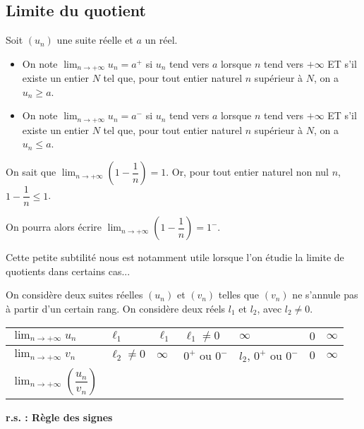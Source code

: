 \documentclass[11pt,fleqn]{book} %
\begin{document}
\subsection{Limite du quotient}


\begin{definition}Soit $(u_n)$ une suite réelle et $a$ un réel. 

\begin{itemize}
\item On note $\displaystyle\lim_{n \to +\infty}u_n = a^+$ si $u_n$ tend vers $a$ lorsque $n$ tend vers $+\infty$ ET s'il existe un entier $N$ tel que, pour tout entier naturel $n$ supérieur à $N$, on a $u_n \geqslant a$.
\item On note $\displaystyle\lim_{n \to +\infty}u_n = a^-$ si $u_n$ tend vers $a$ lorsque $n$ tend vers $+\infty$ ET s'il existe un entier $N$ tel que, pour tout entier naturel $n$ supérieur à $N$, on a $u_n \leqslant a$.\end{itemize}
\end{definition}

\begin{example}On sait que $\displaystyle\lim_{n \to + \infty}\left(1-\dfrac{1}{n}\right)=1$. Or, pour tout entier naturel non nul $n$, $1-\dfrac{1}{n}\leqslant 1$. 

On pourra alors écrire $\displaystyle\lim_{n \to + \infty}\left(1-\dfrac{1}{n}\right)=1^-$.\end{example}

Cette petite subtilité nous est notamment utile lorsque l'on étudie la limite de quotients dans certains cas...


\begin{proposition}On considère deux suites réelles $(u_n)$ et $(v_n)$ telles que $(v_n)$ ne s'annule pas à partir d'un certain rang. On considère deux réels $l_1$ et $l_2$, avec $l_2 \neq 0$. 
\vskip10pt
\begin{tabularx}{\linewidth}{|l|X|X|X|X|c|c|}
\hline
$\displaystyle \lim_{n \to +\infty} u_n$ & $\ell_1 $ & $\ell_1$ & $\ell_1 \neq 0$ & $\infty$  & $0$ & $\infty$\\
\hline
$\displaystyle \lim_{n \to +\infty} v_n$ & $\ell_2 \neq 0$ & $\infty$ &  $0^+$ ou $0^-$ &  $l_2$, $0^+$ ou $0^-$ & $0$ & $\infty$ \\
\hline
$\displaystyle \lim_{n \to +\infty} \left(\dfrac{u_n}{ v_n}\right)$ &  &  &   &  & \multicolumn{2}{|c|}{ } \\
\hline\end{tabularx}


\begin{center}
 \textbf{r.s. : Règle des signes}\\
 \end{center} 
 \vspace{-1cm}\end{proposition}
 
\end{document}
